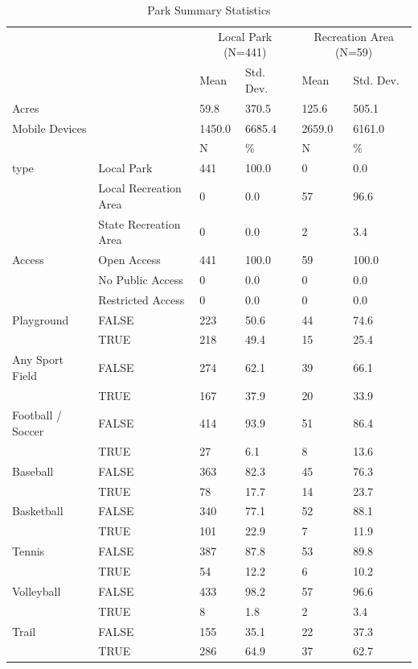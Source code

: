 \documentclass[3p, authoryear, review]{elsarticle} %
\begin{document}
\begin{table}

\caption{\label{tab:park-attributes}Park Summary Statistics}
\centering
\begin{tabular}[t]{llllll}
\toprule
\multicolumn{2}{c}{ } & \multicolumn{2}{c}{Local Park (N=441)} & \multicolumn{2}{c}{Recreation Area (N=59)} \\
\cmidrule(l{3pt}r{3pt}){3-4} \cmidrule(l{3pt}r{3pt}){5-6}
  &    & Mean & Std. Dev. & Mean  & Std. Dev. \\
\midrule
Acres &  & 59.8 & 370.5 & 125.6 & 505.1\\
Mobile Devices &  & 1450.0 & 6685.4 & 2659.0 & 6161.0\\
\midrule
 &  & N & \% & N & \%\\
type & Local Park & 441 & 100.0 & 0 & 0.0\\
 & Local Recreation Area & 0 & 0.0 & 57 & 96.6\\
 & State Recreation Area & 0 & 0.0 & 2 & 3.4\\
Access & Open Access & 441 & 100.0 & 59 & 100.0\\
 & No Public Access & 0 & 0.0 & 0 & 0.0\\
 & Restricted Access & 0 & 0.0 & 0 & 0.0\\
Playground & FALSE & 223 & 50.6 & 44 & 74.6\\
 & TRUE & 218 & 49.4 & 15 & 25.4\\
Any Sport Field & FALSE & 274 & 62.1 & 39 & 66.1\\
 & TRUE & 167 & 37.9 & 20 & 33.9\\
Football / Soccer & FALSE & 414 & 93.9 & 51 & 86.4\\
 & TRUE & 27 & 6.1 & 8 & 13.6\\
Baseball & FALSE & 363 & 82.3 & 45 & 76.3\\
 & TRUE & 78 & 17.7 & 14 & 23.7\\
Basketball & FALSE & 340 & 77.1 & 52 & 88.1\\
 & TRUE & 101 & 22.9 & 7 & 11.9\\
Tennis & FALSE & 387 & 87.8 & 53 & 89.8\\
 & TRUE & 54 & 12.2 & 6 & 10.2\\
Volleyball & FALSE & 433 & 98.2 & 57 & 96.6\\
 & TRUE & 8 & 1.8 & 2 & 3.4\\
Trail & FALSE & 155 & 35.1 & 22 & 37.3\\
 & TRUE & 286 & 64.9 & 37 & 62.7\\
\bottomrule
\end{tabular}
\end{table}
\end{document}

